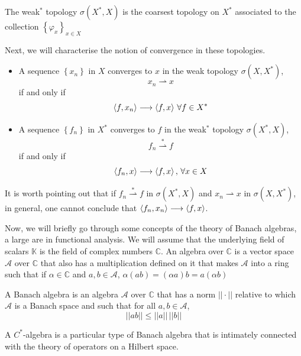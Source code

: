 \begin{definicion}
    The weak$^*$ topology $\sigma(X^*,X)$ is the coarsest topology on $X^*$ associated to the collection $\left\lbrace \varphi _x \right\rbrace_{x\in X}$
\end{definicion}

Next, we will characterise the notion of convergence in these topologies.
\begin{definicion}
    \begin{itemize}
        \item A sequence $\left\lbrace x_n \right \rbrace$ in $X$ converges to $x$ in the weak topology $\sigma(X,X^*)$,
        $$x_n \rightharpoonup x $$
        if and only if $$\braket{f,x_n} \longrightarrow \braket{f,x}\, \forall f \in X^*$$

        \item A sequence $\left\lbrace f_n \right\rbrace$ in $X^*$ converges to $f$ in the weak$^*$ topology $\sigma(X^*,X)$, 
        $$f_n \stackrel{*}{\rightharpoonup} f $$
        if and only if 
        $$\braket{f_n,x}\longrightarrow \braket{f,x},\, \forall x \in X$$
    \end{itemize}
\end{definicion}

It is worth pointing out that if $f_n \stackrel{*}{\rightharpoonup} f $ in $\sigma(X^*,X)$ and $x_n \rightharpoonup x$ in $\sigma(X,X^*)$, in general, one cannot conclude that $\braket{f_n,x_n} \longrightarrow \braket{f,x}$. 

Now, we will briefly go through some concepts of the theory of Banach algebras, a large are in functional analysis. We will assume that the underlying field of scalars $\mathbb{K}$ is the field of complex numbers $\mathbb{C}$. An algebra over $\mathbb{C}$ is a vector space $\mathcal{A}$ over $\mathbb{C}$ that also has a multiplication defined on it that makes $\mathcal{A}$ into a ring such that if $\alpha \in \mathbb{C}$ and $a,b \in \mathcal{A}$, $\alpha(ab)=(\alpha a)b = a(\alpha b)$

\begin{definicion}
    A Banach algebra is an algebra $\mathcal{A}$ over $\mathbb{C}$ that has a norm $||\cdot||$ relative to which $\mathcal{A}$ is a Banach space and such that for all $a,b \in \mathcal{A}$,
    $$||ab|| \leq ||a||\,||b||$$
\end{definicion}

A $C^*$-algebra is a particular type of Banach algebra that is intimately connected with the theory of operators on a Hilbert space.

